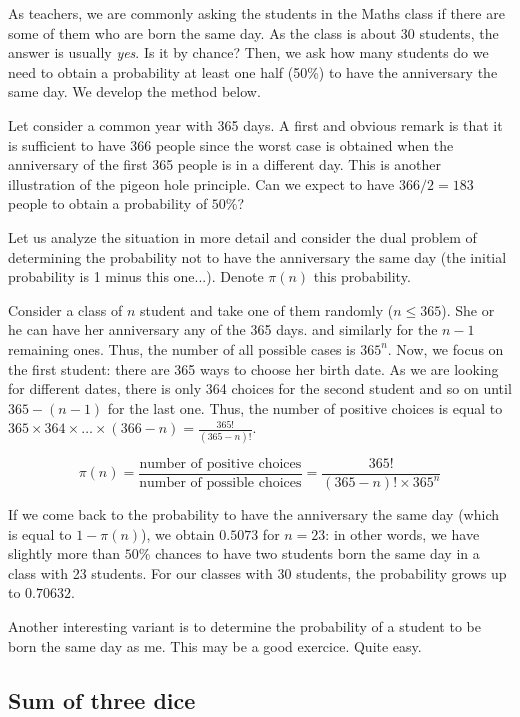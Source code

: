 As teachers, we are commonly asking the students in the Maths class if there are some of them who are born the same day.
As the class is about 30 students, the answer is usually \textit{yes}. 
Is it by chance?
Then, we ask how many students do we need to obtain a probability at least one half (50\%) to have the anniversary the same day.
We develop the method below.
\bigskip

Let consider a common year with 365 days. 
A first and obvious remark is that it is sufficient to have 366 people since the worst case is obtained when the anniversary 
of the first 365 people is in a different day. This is another illustration of the pigeon hole principle. 
Can we expect to have $366/2 = 183$ people to obtain a probability of $50\%$?
\bigskip

Let us analyze the situation in more detail and consider the dual problem of determining the probability 
not to have the anniversary the same day (the initial probability is 1 minus this one...). 
Denote $\pi(n)$ this probability.

Consider a class of $n$ student and take one of them randomly ($n \leq 365$).
She or he can have her anniversary any of the 365 days. 
and similarly for the $n-1$ remaining ones. 
Thus, the number of all possible cases is $365^n$. 
Now, we focus on the first student: there are 365 ways to choose her birth date.
As we are looking for different dates, there is only 364 choices for the second student and so on until $365-(n-1)$ 
for the last one.
Thus, the number of positive choices is equal to $365 \times 364 \times \ldots \times (366-n) = \frac{365!}{(365-n)!}$.

\[ 
\pi(n) = \frac{\mbox{number of positive choices}}{\mbox{number of possible choices}} = \frac{365!}{ (365-n)!  \times 365^n}
\]

If we come back to the probability to have the anniversary the same day (which is equal to $1-\pi(n)$),
we obtain $0.5073$ for $n=23$: in other words, we have slightly more than $50\%$ chances to have two students born 
the same day 
in a class with 23 students.
For our classes with $30$ students, the probability grows up to $0.70632$. 

{\Denis Another interesting variant is to determine the probability of a student to be born the same day as me. This may be a good exercice. Quite easy.}


\subsection{Sum of three dice}

